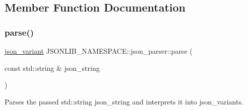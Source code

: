 \subsection{Member Function Documentation}
\mbox{\label{classJSONLIB__NAMESPACE_1_1json__parser_a8f097c29f98ed795a92b5941c9070f8b}} 
\subsubsection{\texorpdfstring{parse()}{parse()}\hspace{0.1cm}{\footnotesize\ttfamily [1/2]}}
{\footnotesize\ttfamily \hyperlink{classJSONLIB__NAMESPACE_1_1json__variant}{json\+\_\+variant} J\+S\+O\+N\+L\+I\+B\+\_\+\+N\+A\+M\+E\+S\+P\+A\+C\+E\+::json\+\_\+parser\+::parse (\begin{DoxyParamCaption}\item[{const std\+::string \&}]{json\+\_\+string }\end{DoxyParamCaption})\hspace{0.3cm}{\ttfamily [static]}}



Parses the passed std\+::string {\ttfamily json\+\_\+string} and interprets it into json\+\_\+variants. 


